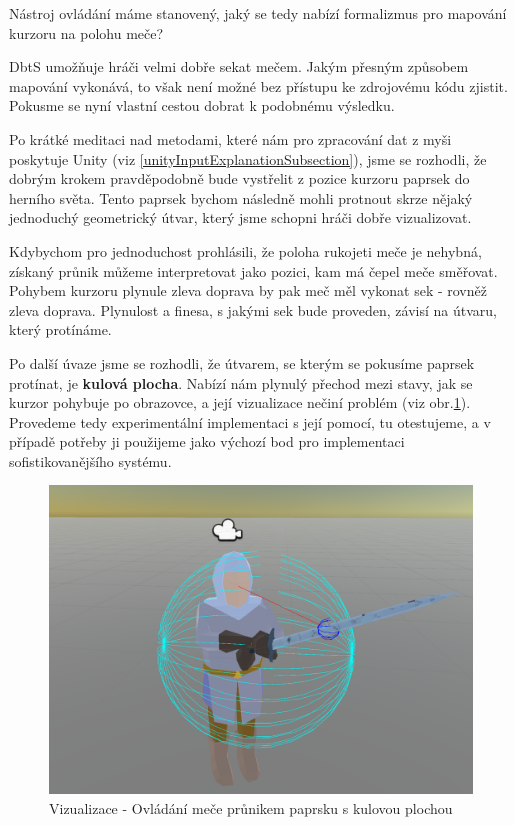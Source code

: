 Nástroj ovládání máme stanovený, jaký se tedy nabízí formalizmus pro mapování kurzoru na polohu meče?

\acl{DbtS} umožňuje hráči velmi dobře sekat mečem. Jakým přesným způsobem mapování vykonává, to však není možné bez přístupu ke zdrojovému kódu zjistit. Pokusme se nyní vlastní cestou dobrat k podobnému výsledku.

Po krátké meditaci nad metodami, které nám pro zpracování dat z myši poskytuje Unity (viz \ref{unityInputExplanationSubsection}), jsme se rozhodli, že dobrým krokem pravděpodobně bude vystřelit z pozice kurzoru paprsek do herního světa. Tento paprsek bychom následně mohli protnout skrze nějaký jednoduchý geometrický útvar, který jsme schopni hráči dobře vizualizovat. 

Kdybychom pro jednoduchost prohlásili, že poloha rukojeti meče je nehybná, získaný průnik můžeme interpretovat jako pozici, kam má čepel meče směřovat. Pohybem kurzoru plynule zleva doprava by pak meč měl vykonat sek - rovněž zleva doprava. Plynulost a finesa, s jakými sek bude proveden, závisí na útvaru, který protínáme. 

Po další úvaze jsme se rozhodli, že útvarem, se kterým se pokusíme paprsek protínat, je \textbf{kulová plocha}. Nabízí nám plynulý přechod mezi stavy, jak se kurzor pohybuje po obrazovce, a její vizualizace nečiní problém (viz obr.\ref{obr04:sphereVisualization}).
\bigbreak
Provedeme tedy experimentální implementaci s její pomocí, tu otestujeme, a v případě potřeby ji použijeme jako výchozí bod pro implementaci sofistikovanějšího systému.

\begin{figure}[ht]\centering
    \center
    \includegraphics[width=140mm]{../img/IntersectableSphere.png}
    \caption{Vizualizace - Ovládání meče průnikem paprsku s kulovou plochou}
    \label{obr04:sphereVisualization}
\end{figure} 

